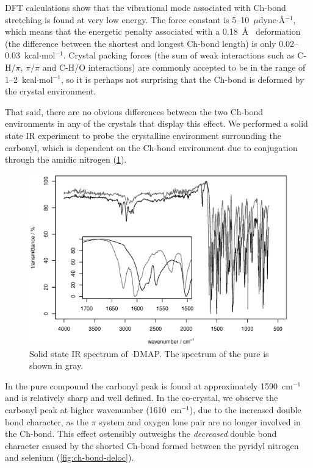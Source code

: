 \begin{refsection}
DFT calculations show that the vibrational mode associated with Ch-bond stretching is found at very low energy.
The force constant is 5--10~$\mu$dyne$\cdot$\AA$^{-1}$, which means that the energetic penalty associated with a 0.18~\AA~ deformation (the difference between the shortest and longest Ch-bond length) is only 0.02--0.03~kcal$\cdot$mol$^{-1}$.
Crystal packing forces (the sum of weak interactions such as C-H/$\pi$, $\pi /\pi$ and C-H/O interactions) are commonly accepted to be in the range of 1--2~kcal$\cdot$mol$^{-1}$, so it is perhaps not surprising that the Ch-bond is deformed by the crystal environment.\autocite{Dunitz1988}

That said, there are no obvious differences between the two Ch-bond environments in any of the crystals that display this effect.
We performed a solid state IR experiment to probe the crystalline environment surrounding the carbonyl, which is dependent on the Ch-bond environment due to conjugation through the amidic nitrogen (\ref{fig:ebs-4oet-dmap-ir}).

\begin{figure}
    \centering
    \includegraphics[width=\linewidth]{Figures/ebs-4oet-dmap-ir.eps}
    \caption{Solid state IR spectrum of $\cdot$DMAP. The spectrum of the pure  is shown in gray.}
    \label{fig:ebs-4oet-dmap-ir}
\end{figure}

In the pure compound the carbonyl peak is found at approximately 1590~cm$^{-1}$ and is relatively sharp and well defined.
In the co-crystal, we observe the carbonyl peak at higher wavenumber (1610~cm$^{-1}$), due to the increased double bond character, as the $\pi$ system and oxygen lone pair are no longer involved in the Ch-bond.
This effect ostensibly outweighs the \emph{decreased} double bond character caused by the shorted Ch-bond formed between the pyridyl nitrogen and selenium (\ref{fig:ch-bond-deloc}).


\end{refsection}
